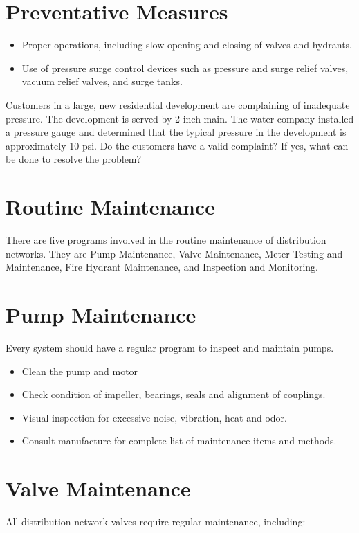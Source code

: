 \documentclass[10pt]{article}
\begin{document}
\section{Preventative Measures}
\begin{itemize}
  \item Proper operations, including slow opening and closing of valves and hydrants.

  \item Use of pressure surge control devices such as pressure and surge relief valves, vacuum relief valves, and surge tanks.

\end{itemize}
Customers in a large, new residential development are complaining of inadequate pressure. The development is served by 2-inch main. The water company installed a pressure gauge and determined that the typical pressure in the development is approximately 10 psi. Do the customers have a valid complaint? If yes, what can be done to resolve the problem?

\section{Routine Maintenance}
There are five programs involved in the routine maintenance of distribution networks. They are Pump Maintenance, Valve Maintenance, Meter Testing and Maintenance, Fire Hydrant Maintenance, and Inspection and Monitoring.

\section{Pump Maintenance}
Every system should have a regular program to inspect and maintain pumps.

\begin{itemize}
  \item Clean the pump and motor

  \item Check condition of impeller, bearings, seals and alignment of couplings.

  \item Visual inspection for excessive noise, vibration, heat and odor.

  \item Consult manufacture for complete list of maintenance items and methods.

\end{itemize}
\section{Valve Maintenance}
All distribution network valves require regular maintenance, including:
\end{document}

